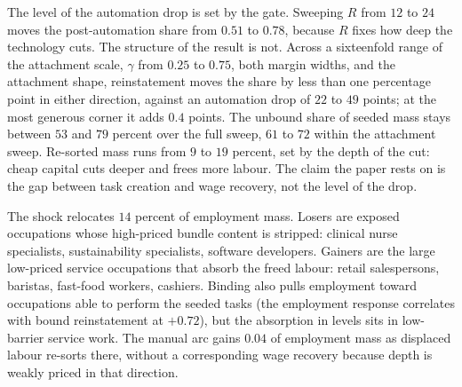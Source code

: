 \documentclass[12pt, a4paper]{article}
\begin{document}
The level of the automation drop is set by the gate. Sweeping $R$ from
$12$ to $24$ moves the post-automation share from $0.51$ to $0.78$,
because $R$ fixes how deep the technology cuts. The structure of the
result is not. Across a sixteenfold range of the attachment scale,
$\gamma$ from $0.25$ to $0.75$, both margin widths, and the attachment
shape, reinstatement moves the share by less than one percentage point
in either direction, against an automation drop of $22$ to $49$ points;
at the most generous corner it adds $0.4$ points. The unbound share of
seeded mass stays between $53$ and $79$ percent over the full sweep,
$61$ to $72$ within the attachment sweep. Re-sorted mass runs from $9$
to $19$ percent, set by the depth of the cut: cheap capital cuts deeper
and frees more labour. The claim the paper rests on is the gap between
task creation and wage recovery, not the level of the drop.

The shock relocates $14$ percent of employment mass. Losers are
exposed occupations whose high-priced bundle content is stripped:
clinical nurse specialists, sustainability specialists, software
developers. Gainers are the large low-priced service occupations that
absorb the freed labour: retail salespersons, baristas, fast-food
workers, cashiers. Binding also pulls employment toward occupations
able to perform the seeded tasks (the employment response correlates
with bound reinstatement at $+0.72$), but the absorption in levels
sits in low-barrier service work. The manual arc gains $0.04$ of
employment mass as displaced labour re-sorts there, without a
corresponding wage recovery because depth is weakly priced in that
direction.
\end{document}
